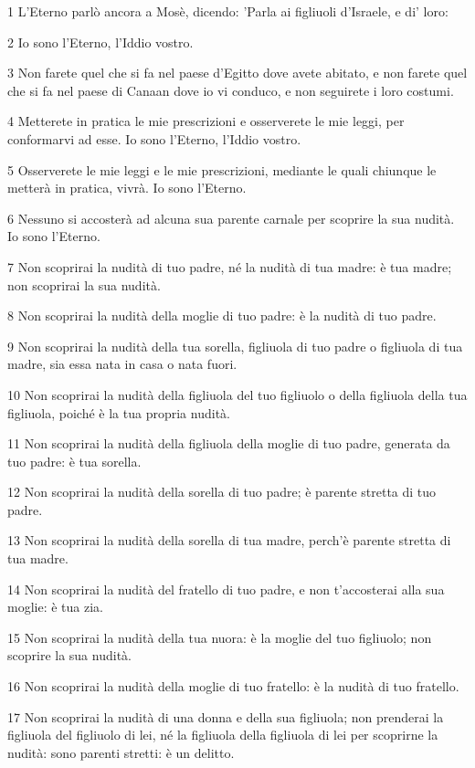 \par 1 L'Eterno parlò ancora a Mosè, dicendo: 'Parla ai figliuoli d'Israele, e di' loro:
\par 2 Io sono l'Eterno, l'Iddio vostro.
\par 3 Non farete quel che si fa nel paese d'Egitto dove avete abitato, e non farete quel che si fa nel paese di Canaan dove io vi conduco, e non seguirete i loro costumi.
\par 4 Metterete in pratica le mie prescrizioni e osserverete le mie leggi, per conformarvi ad esse. Io sono l'Eterno, l'Iddio vostro.
\par 5 Osserverete le mie leggi e le mie prescrizioni, mediante le quali chiunque le metterà in pratica, vivrà. Io sono l'Eterno.
\par 6 Nessuno si accosterà ad alcuna sua parente carnale per scoprire la sua nudità. Io sono l'Eterno.
\par 7 Non scoprirai la nudità di tuo padre, né la nudità di tua madre: è tua madre; non scoprirai la sua nudità.
\par 8 Non scoprirai la nudità della moglie di tuo padre: è la nudità di tuo padre.
\par 9 Non scoprirai la nudità della tua sorella, figliuola di tuo padre o figliuola di tua madre, sia essa nata in casa o nata fuori.
\par 10 Non scoprirai la nudità della figliuola del tuo figliuolo o della figliuola della tua figliuola, poiché è la tua propria nudità.
\par 11 Non scoprirai la nudità della figliuola della moglie di tuo padre, generata da tuo padre: è tua sorella.
\par 12 Non scoprirai la nudità della sorella di tuo padre; è parente stretta di tuo padre.
\par 13 Non scoprirai la nudità della sorella di tua madre, perch'è parente stretta di tua madre.
\par 14 Non scoprirai la nudità del fratello di tuo padre, e non t'accosterai alla sua moglie: è tua zia.
\par 15 Non scoprirai la nudità della tua nuora: è la moglie del tuo figliuolo; non scoprire la sua nudità.
\par 16 Non scoprirai la nudità della moglie di tuo fratello: è la nudità di tuo fratello.
\par 17 Non scoprirai la nudità di una donna e della sua figliuola; non prenderai la figliuola del figliuolo di lei, né la figliuola della figliuola di lei per scoprirne la nudità: sono parenti stretti: è un delitto.
